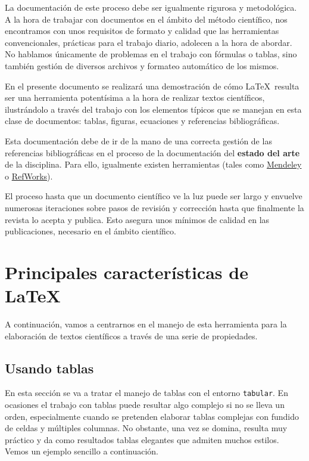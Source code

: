 \documentclass[review]{elsarticle}
\begin{document}
La documentación de este proceso debe ser igualmente rigurosa y metodológica. A la hora de trabajar con documentos en el ámbito del método científico, nos encontramos con unos requisitos de formato y calidad que las herramientas convencionales, prácticas para el trabajo diario, adolecen a la hora de abordar. No hablamos únicamente de problemas en el trabajo con fórmulas o tablas, sino también gestión de diversos archivos y formateo automático de los mismos. 

En el presente documento se realizará una demostración de cómo \LaTeX\ resulta ser una herramienta potentísima a la hora de realizar textos científicos, ilustrándolo a través del trabajo con los elementos típicos que se manejan en esta clase de documentos: tablas, figuras, ecuaciones y referencias bibliográficas.

Esta documentación debe de ir de la mano de una correcta gestión de las referencias bibliográficas en el proceso de la documentación del \textbf{estado del arte} de la disciplina. Para ello, igualmente existen herramientas (tales como \href{https://www.mendeley.com}{Mendeley} o \href{https://www.refworks.com/es/}{RefWorks}).

El proceso hasta que un documento científico ve la luz puede ser largo y envuelve numerosas iteraciones sobre pasos de revisión y corrección hasta que finalmente la revista lo acepta y publica. Esto asegura unos mínimos de calidad en las publicaciones, necesario en el ámbito científico. 

\section{Principales características de \LaTeX\ }

A continuación, vamos a centrarnos en el manejo de esta herramienta para la elaboración de textos científicos a través de una serie de propiedades. 
\subsection{Usando tablas}

En esta sección se va a tratar el manejo de tablas con el entorno \texttt{tabular}. En ocasiones el trabajo con tablas puede resultar algo complejo si no se lleva un orden, especialmente cuando se pretenden elaborar tablas complejas con fundido de celdas y múltiples columnas. No obstante, una vez se domina, resulta muy práctico y da como resultados tablas elegantes que admiten muchos estilos. Vemos un ejemplo sencillo a continuación. 
\end{document}
